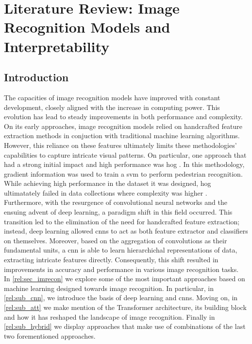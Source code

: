 \chapter{Literature Review: Image Recognition Models and Interpretability}
\label{ch:rel}
\chaptertoc{}
\section{Introduction}
The capacities of image recognition models have improved with constant development, 
closely aligned with the increase in computing power. This evolution has lead to steady 
improvements in both performance and complexity. On its early approaches, image recognition models 
relied on handcrafted feature extraction methods  in conjuction with traditional machine learning 
algorithms. However, this reliance on these features ultimately limits these methodologies' 
capabilities to capture intricate visual patterns.
On particular, one approach that had a strong initial impact and high performance was \gls{hog} 
\autocite{dalal2005histograms}. In this methodology, gradient information was used to train a 
\gls{svm} to perform pedestrian recognition. While achieving high performance in the dataset it was 
designed, \gls{hog} ultimatately failed in data collections where complexity was higher 
\autocite{5975165}.\\
Furthermore, with the resurgence of convolutional neural networks and the ensuing advent of 
deep learning, a paradigm shift in this field occurred. This transition led to the elimination of 
the need for handcrafted feature extraction; instead, deep learning allowed \glspl{cnn} to act 
as both feature extractor and classifiers on themselves. Moreover, based on the aggregation of 
convolutions as their fundamental units, a \gls{cnn} is able to learn hierarchichal 
representations of data, extracting intricate features directly. 
Consequently, this shift resulted in improvements in accuracy and performance in various image 
recognition tasks. \\

\noindent In \autoref{rel:sec_imrecon} we explore some of the most important approaches based 
on machine learning designed towards image recognition. In particular, in \autoref{rel:sub_cnn}, we 
introduce the basis of deep learning and \glspl{cnn}. Moving on, in \autoref{rel:sub_att} we make 
mention of the Transformer architecture, its building block and how it has reshaped the landscape 
of image recognition. Finally in \autoref{rel:sub_hybrid} we display approaches that make use of 
combinations of the last two forementioned approaches.\\


